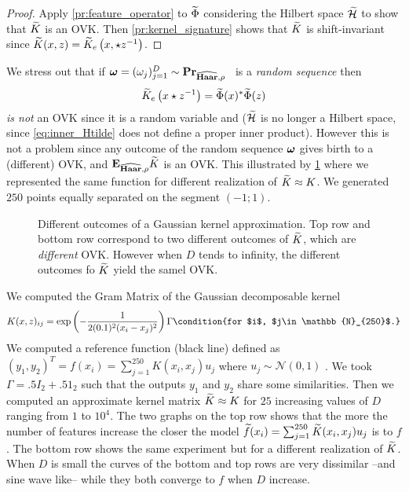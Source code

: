 \begin{proof} Apply \cref{pr:feature_operator} to $\widetilde{\Phi}$ considering the Hilbert space $\widetilde{\mathcal{H}}$ to show that $\widetilde{K}$ is an \acs{OVK}. Then \cref{pr:kernel_signature} shows that $\widetilde{K}$ is shift-invariant since $\widetilde{K}(x,z)=\widetilde{K}_e\left(x,\star z^{-1}\right)$.
\end{proof}
We stress out that if $\boldsymbol{\mathbf{\omega}}=(\omega_j)_{j=1}^D\sim {\mathbf{{Pr}}}_{\widehat{\mathbf{Haar}},\rho}$ \iid~is a \emph{random sequence} then
\begin{dmath*}
\tildeK{\omega}_e\left(x\groupop z^{-1}\right)=\tildePhi{\omega}(x)^{\adjoint}\tildePhi{\omega}(z)
\end{dmath*}
\emph{is not} an \acl{OVK} since it is a random variable and ($\widetilde{\mathcal{H}}$ is no longer a Hilbert space, since \cref{eq:inner_Htilde} does not define a proper inner product). However this is not a problem since any outcome of the random sequence $\boldsymbol{\mathbf{\omega}}$ gives birth to a (different) \acl{OVK}, and ${\mathbf{{E}}}_{\widehat{\mathbf{Haar}},\rho}\widetilde{K}$ is an \acs{OVK}. This illustrated by \cref{fig:not_Mercer} where we represented the same function for different realization of $\widetilde{K}\approx K$. We generated $250$ points equally separated on the segment $(-1;1)$.
\begin{figure}[htb]
\centering
\resizebox{\textwidth}{!}{%

}
\caption[Different outcomes of a Gaussian kernel approximation]{Different outcomes of a Gaussian kernel approximation. Top row and bottom row correspond to two different outcomes of $\widetilde{K}$, which are \emph{different} \acl{OVK}. However when $D$ tends to infinity, the different outcomes fo $\widetilde{K}$ yield the samel \acs{OVK}.}
\label{fig:not_Mercer}
\end{figure}
We computed the Gram Matrix of the Gaussian decomposable kernel
\begin{dmath*}
K(x,z)_{ij}=\exp\left(-\frac{1}{2(0.1)^2(x_i - x_j)^2}\right)\Gamma \condition{for $i$, $j\in\mathbb{N}_{250}$.}
\end{dmath*}
We computed a reference function (black line) defined as $(y_1, y_2)^T = f(x_i)=\sum_{j=1}^{250}K(x_i,x_j)u_j$ where $u_j\sim\mathcal{N}(0,1)$ \iid. We took $\Gamma=.5 I_2 + .5 1_2$ such that the outputs $y_1$ and $y_2$ share some similarities. Then we computed an approximate kernel matrix $\widetilde{K}\approx K$ for $25$ increasing values of $D$ ranging from $1$ to $10^4$. The two graphs on the top row shows that the more the number of features increase the closer the model $\widetilde{f}(x_i)=\sum_{j=1}^{250}\widetilde{K}(x_i,x_j)u_j$ is to $f$. The bottom row shows the same experiment but for a different realization of $\widetilde{K}$. When $D$ is small the curves of the bottom and top rows are very dissimilar --and sine wave like-- while they both converge to $f$ when $D$ increase.
